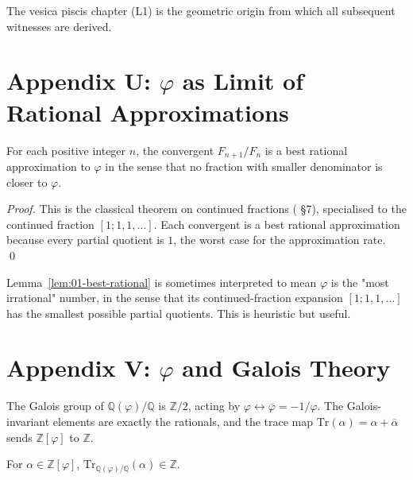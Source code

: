 The vesica piscis chapter (L1) is the geometric origin from which all
subsequent witnesses are derived.

\section*{Appendix U: $\varphi$ as Limit of Rational Approximations}
\label{fa_01:sec:01-app-U}

\begin{lemma}
\label{lem:01-best-rational}
For each positive integer $n$, the convergent $F_{n+1}/F_n$ is a
best rational approximation to $\varphi$ in the sense that no
fraction with smaller denominator is closer to $\varphi$.
\end{lemma}

\begin{proof}
This is the classical theorem on continued fractions
(\cite{niven_irrational} \S 7), specialised to the continued fraction
$[1; 1, 1, \ldots]$. Each convergent is a best rational approximation
because every partial quotient is $1$, the worst case for the
approximation rate.
\qed
\end{proof}

\begin{remark}
Lemma~\ref{lem:01-best-rational} is sometimes interpreted to mean
$\varphi$ is the "most irrational" number, in the sense that its
continued-fraction expansion $[1; 1, 1, \ldots]$ has the smallest
possible partial quotients. This is heuristic but useful.
\end{remark}

\section*{Appendix V: $\varphi$ and Galois Theory}
\label{fa_01:sec:01-app-V}

The Galois group of $\mathbb{Q}(\varphi)/\mathbb{Q}$ is $\mathbb{Z}/2$,
acting by $\varphi \leftrightarrow \overline{\varphi} = -1/\varphi$.
The Galois-invariant elements are exactly the rationals, and the
trace map $\mathrm{Tr}(\alpha) = \alpha + \overline{\alpha}$ sends
$\mathbb{Z}[\varphi]$ to $\mathbb{Z}$.

\begin{theorem}\label{fa_01:thm:01-trace-as-Z}
For $\alpha \in \mathbb{Z}[\varphi]$, $\mathrm{Tr}_{
\mathbb{Q}(\varphi)/\mathbb{Q}}(\alpha) \in \mathbb{Z}$.
\end{theorem}

